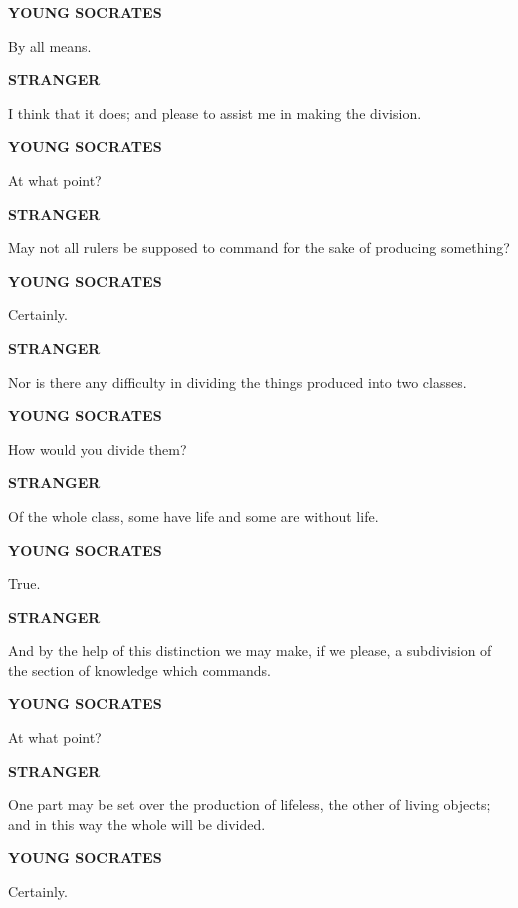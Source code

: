 \documentclass[11pt,letter]{article}
\begin{document}
\par \textbf{YOUNG SOCRATES}
\par   By all means.

\par \textbf{STRANGER}
\par   I think that it does; and please to assist me in making the division.

\par \textbf{YOUNG SOCRATES}
\par   At what point?

\par \textbf{STRANGER}
\par   May not all rulers be supposed to command for the sake of producing something?

\par \textbf{YOUNG SOCRATES}
\par   Certainly.

\par \textbf{STRANGER}
\par   Nor is there any difficulty in dividing the things produced into two classes.

\par \textbf{YOUNG SOCRATES}
\par   How would you divide them?

\par \textbf{STRANGER}
\par   Of the whole class, some have life and some are without life.

\par \textbf{YOUNG SOCRATES}
\par   True.

\par \textbf{STRANGER}
\par   And by the help of this distinction we may make, if we please, a subdivision of the section of knowledge which commands.

\par \textbf{YOUNG SOCRATES}
\par   At what point?

\par \textbf{STRANGER}
\par   One part may be set over the production of lifeless, the other of living objects; and in this way the whole will be divided.

\par \textbf{YOUNG SOCRATES}
\par   Certainly.
\end{document}
